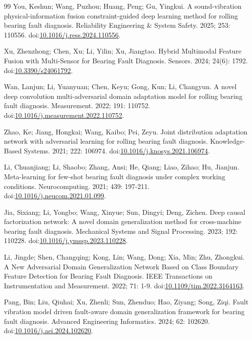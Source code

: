 \documentclass[machines,article,submit,oneauthor]{Definitions/mdpi}
\begin{document}
\begin{thebibliography}{99}
 You, Keshun; Wang, Puzhou; Huang, Peng; Gu, Yingkui. A sound-vibration physical-information fusion constraint-guided deep learning method for rolling bearing fault diagnosis. Reliability Engineering \& System Safety. 2025; 253: 110556. doi:\url{10.1016/j.ress.2024.110556}.

 Xu, Zhenzhong; Chen, Xu; Li, Yilin; Xu, Jiangtao. Hybrid Multimodal Feature Fusion with Multi-Sensor for Bearing Fault Diagnosis. Sensors. 2024; 24(6): 1792. doi:\url{10.3390/s24061792}.

 Wan, Lanjun; Li, Yuanyuan; Chen, Keyu; Gong, Kun; Li, Changyun. A novel deep convolution multi-adversarial domain adaptation model for rolling bearing fault diagnosis. Measurement. 2022; 191: 110752. doi:\url{10.1016/j.measurement.2022.110752}.

 Zhao, Ke; Jiang, Hongkai; Wang, Kaibo; Pei, Zeyu. Joint distribution adaptation network with adversarial learning for rolling bearing fault diagnosis. Knowledge-Based Systems. 2021; 222: 106974. doi:\url{10.1016/j.knosys.2021.106974}.

 Li, Chuanjiang; Li, Shaobo; Zhang, Ansi; He, Qiang; Liao, Zihao; Hu, Jianjun. Meta-learning for few-shot bearing fault diagnosis under complex working conditions. Neurocomputing. 2021; 439: 197-211. doi:\url{10.1016/j.neucom.2021.01.099}.

 Jia, Sixiang; Li, Yongbo; Wang, Xinyue; Sun, Dingyi; Deng, Zichen. Deep causal factorization network: A novel domain generalization method for cross-machine bearing fault diagnosis. Mechanical Systems and Signal Processing. 2023; 192: 110228. doi:\url{10.1016/j.ymssp.2023.110228}.

 Li, Jingde; Shen, Changqing; Kong, Lin; Wang, Dong; Xia, Min; Zhu, Zhongkui. A New Adversarial Domain Generalization Network Based on Class Boundary Feature Detection for Bearing Fault Diagnosis. IEEE Transactions on Instrumentation and Measurement. 2022; 71: 1-9. doi:\url{10.1109/tim.2022.3164163}.

 Pang, Bin; Liu, Qiuhai; Xu, Zhenli; Sun, Zhenduo; Hao, Ziyang; Song, Ziqi. Fault vibration model driven fault-aware domain generalization framework for bearing fault diagnosis. Advanced Engineering Informatics. 2024; 62: 102620. doi:\url{10.1016/j.aei.2024.102620}.


\end{thebibliography}
\end{document}
